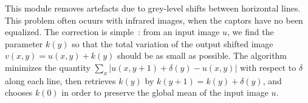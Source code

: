 This module removes artefacts due to grey-level shifts between horizontal lines. This problem often ocuurs with infrared images, when the captors have no been equalized. The correction is simple~: from an input image $u$, we find the parameter $k(y)$ so that the total variation of the output shifted image $v(x,y)=u(x,y)+k(y)$ should be as small as possible. The algorithm minimizes the quantity $\sum_x |u(x,y+1)+\delta(y)-u(x,y)|$ with respect to $\delta$ along each line, then retrieves $k(y)$ by $k(y+1)=k(y)+\delta(y)$, and chooses $k(0)$ in order to preserve the global mean of the input image $u$.
